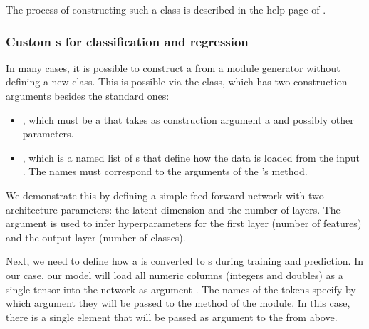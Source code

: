 \documentclass[article]{jss}
\theoremstyle{definition}
\begin{document}
The process of constructing such a class is described in the help page of .

\subsubsection[Custom Learners for classification and regression]{Custom s for classification and regression}\label{sec:extending-learner}

In many cases, it is possible to construct a  from a module generator without defining a new class.
This is possible via the  class, which has two construction arguments besides the standard ones:
\begin{itemize}
    \item {}, which must be a  that takes as construction argument a  and possibly other parameters.
    \item {}, which is a named list of s that define how the data is loaded from the input . The names must correspond to the arguments of the 's  method.
\end{itemize}

We demonstrate this by defining a simple feed-forward network with two architecture parameters: the latent dimension and the number of layers.
The  argument is used to infer hyperparameters for the first layer (number of features) and the output layer (number of classes).


Next, we need to define how a  is converted to s during training and prediction.
In our case, our model will load all numeric columns (integers and doubles) as a single tensor into the network as argument .
The names of the tokens specify by which argument they will be passed to the  method of the module.
In this case, there is a single element that will be passed as argument  to the  from above.
\end{document}
